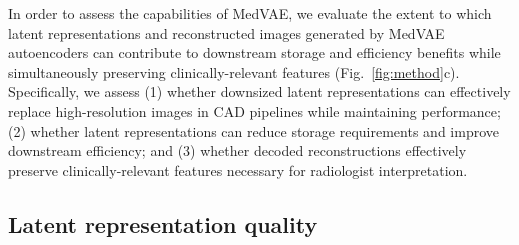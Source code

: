 In order to assess the capabilities of MedVAE, we evaluate the extent to which latent representations and reconstructed images generated by MedVAE autoencoders can contribute to downstream storage and efficiency benefits while simultaneously preserving clinically-relevant features (Fig.~\ref{fig:method}c). Specifically, we assess (1) whether downsized latent representations can effectively replace high-resolution images in CAD pipelines while maintaining performance; (2) whether latent representations can reduce storage requirements and improve downstream efficiency; and (3) whether decoded reconstructions effectively preserve clinically-relevant features necessary for radiologist interpretation. 

\subsection{Latent representation quality}


